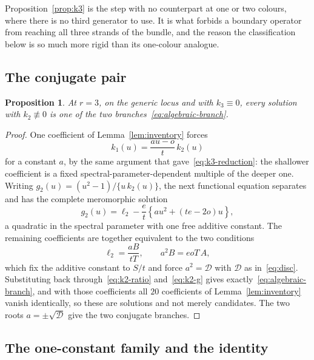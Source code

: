 \documentclass[
  aps,pre,
  reprint,
  superscriptaddress,
  amsmath,amssymb,
  floatfix
]{revtex4-2}
\theoremstyle{plain}
\newtheorem{proposition}[theorem]{Proposition}
\theoremstyle{definition}
\theoremstyle{remark}
\newcommand{\Disc}{\mathcal{D}}
\begin{document}
Proposition~\ref{prop:k3} is the step with no counterpart at one or two
colours, where there is no third generator to use. It is what forbids a
boundary operator from reaching all three strands of the bundle, and the reason
the classification below is so much more rigid than its one-colour analogue.

\subsection{The conjugate pair}

\begin{proposition}
\label{prop:k2}
At $r=3$, on the generic locus and with $k_3\equiv0$, every solution with
$k_2\not\equiv0$ is one of the two branches~\eqref{eq:algebraic-branch}.
\end{proposition}

\begin{proof}
One coefficient of Lemma~\ref{lem:inventory} forces
\begin{equation}
  k_1(u)=\frac{au-o}{t}\,k_2(u)
  \label{eq:k2-ratio}
\end{equation}
for a constant $a$, by the same argument that
gave~\eqref{eq:k3-reduction}: the shallower coefficient is a fixed
spectral-parameter-dependent multiple of the deeper one. Writing
$g_2(u)=(u^2-1)/\{u\,k_2(u)\}$, the next functional equation separates and has
the complete meromorphic solution
\begin{equation}
  g_2(u)=\ell_2-\frac{e}{t}\left\{au^2+(te-2o)u\right\},
  \label{eq:k2-g}
\end{equation}
a quadratic in the spectral parameter with one free additive constant. The
remaining coefficients are together equivalent to the two conditions
\begin{equation}
  \ell_2=\frac{aB}{tT},\qquad a^2B=eoT\,A ,
  \label{eq:k2-constraints}
\end{equation}
which fix the additive constant to $S/t$ and force $a^2=\Disc$ with $\Disc$ as
in~\eqref{eq:disc}. Substituting back through~\eqref{eq:k2-ratio}
and~\eqref{eq:k2-g} gives exactly~\eqref{eq:algebraic-branch}, and with those
coefficients all $20$ coefficients of Lemma~\ref{lem:inventory} vanish
identically, so these are solutions and not merely candidates. The two roots
$a=\pm\sqrt{\Disc}$ give the two conjugate branches.
\end{proof}

\subsection{The one-constant family and the identity}
\end{document}
